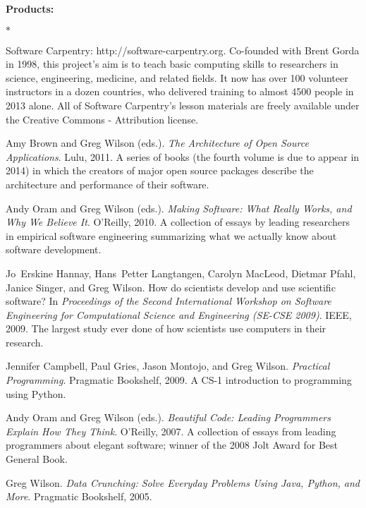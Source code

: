 \documentclass{proposalnsf}
\newlength{\up}
\begin{document}
\textbf{Products:} 

\vspace{\up}
\begin{list}{$\ast$}{\setlength{\leftmargin}{1em}}

\item
Software Carpentry: http://software-carpentry.org.
Co-founded with Brent Gorda in 1998,
this project's aim is to teach basic computing skills to researchers in science, engineering, medicine, and related fields.
It now has over 100 volunteer instructors in a dozen countries,
who delivered training to almost 4500 people in 2013 alone.
All of Software Carpentry's lesson materials are freely available under the Creative Commons - Attribution license.

\item
Amy Brown and Greg Wilson (eds.).
{\em The Architecture of Open Source Applications}.
Lulu, 2011.
A series of books (the fourth volume is due to appear in 2014)
in which the creators of major open source packages describe the architecture and performance of their software.

\item
Andy Oram and Greg Wilson (eds.).
{\em Making Software: What Really Works, and Why We Believe It}.
O'Reilly, 2010.
A collection of essays by leading researchers in empirical software engineering
summarizing what we actually know about software development.

\item
Jo~Erskine Hannay, Hans~Petter Langtangen, Carolyn MacLeod, Dietmar Pfahl, Janice Singer, and Greg Wilson.
How do scientists develop and use scientific software?
In {\em Proceedings of the Second International Workshop on Software Engineering for Computational Science and Engineering (SE-CSE 2009)}. IEEE, 2009.
The largest study ever done of how scientists use computers in their research.

\item
Jennifer Campbell, Paul Gries, Jason Montojo, and Greg Wilson.
{\em Practical Programming}.
Pragmatic Bookshelf, 2009.
A CS-1 introduction to programming using Python.

\item
Andy Oram and Greg Wilson (eds.).
{\em Beautiful Code: Leading Programmers Explain How They Think}.
O'Reilly, 2007.
A collection of essays from leading programmers about elegant software;
winner of the 2008 Jolt Award for Best General Book.

\item
Greg Wilson.
{\em Data Crunching: Solve Everyday Problems Using Java, Python, and More}.
Pragmatic Bookshelf, 2005.

\end{list}
\end{document}
